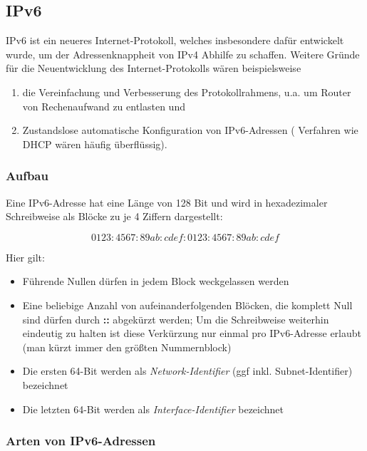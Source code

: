 \documentclass[a4paper, 12pt]{report}
\begin{document}
\subsection{IPv6}

IPv6 ist ein neueres Internet-Protokoll, welches insbesondere dafür entwickelt
wurde, um der Adressenknappheit von IPv4 Abhilfe zu schaffen. Weitere Gründe
für die Neuentwicklung des Internet-Protokolls wären beispielsweise

\begin{enumerate}
	\item die Vereinfachung und Verbesserung des Protokollrahmens, u.a. um
		Router von Rechenaufwand zu entlasten und
	\item Zustandslose automatische Konfiguration von IPv6-Adressen (
		Verfahren wie DHCP wären häufig überflüssig).
\end{enumerate}

\subsubsection{Aufbau}

Eine IPv6-Adresse hat eine Länge von 128 Bit und wird in hexadezimaler
Schreibweise als Blöcke zu je 4 Ziffern dargestellt:

\begin{equation}
	0123:4567:89ab:cdef:0123:4567:89ab:cdef
\end{equation}

Hier gilt:
\begin{itemize}
	\item Führende Nullen dürfen in jedem Block weckgelassen werden
	\item Eine beliebige Anzahl von aufeinanderfolgenden Blöcken, die
		komplett Null sind dürfen durch \textbf{::} abgekürzt werden;
		Um die Schreibweise weiterhin eindeutig zu halten ist diese
		Verkürzung nur einmal pro IPv6-Adresse erlaubt (man kürzt immer
		den größten Nummernblock)
	\item Die ersten 64-Bit werden als \emph{Network-Identifier} (ggf inkl.
		Subnet-Identifier) bezeichnet
	\item Die letzten 64-Bit werden als \emph{Interface-Identifier}
		bezeichnet
\end{itemize}

\subsubsection{Arten von IPv6-Adressen}
\end{document}
